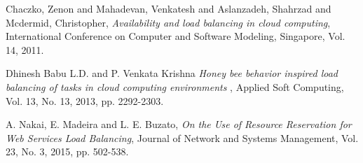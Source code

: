 \begin{thebibliography}{1}
  Chaczko, Zenon and Mahadevan, Venkatesh and Aslanzadeh, Shahrzad and Mcdermid,
  Christopher,
  \emph{Availability and load balancing in cloud computing},
  International Conference on Computer and Software Modeling, Singapore,
  Vol. 14, 2011.

  Dhinesh Babu L.D. and P. Venkata Krishna
  \emph{Honey bee behavior inspired load balancing of tasks in cloud computing environments },
  Applied Soft Computing,
  Vol. 13, No. 13, 2013, pp. 2292-2303.

  A. Nakai, E. Madeira and L. E. Buzato,
  \emph{On the Use of Resource Reservation for Web Services Load Balancing},
  Journal of Network and Systems Management,
  Vol. 23, No. 3, 2015, pp. 502-538.

\end{thebibliography}
